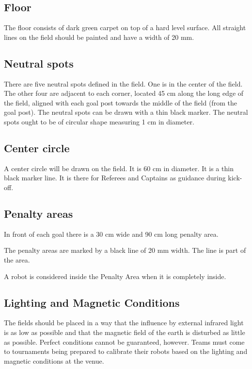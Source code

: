 \documentclass{article}
\begin{document}
\subsection{ Floor \label{ref-033}}

The floor consists of dark green carpet on top of a hard level surface.  All
straight lines on the field should be painted and have a width of 20 mm.

\subsection{ Neutral spots \label{ref-034}}

There are five neutral spots defined in the field. One is in the center of the
field. The other four are adjacent to each corner, located 45 cm along the long
edge of the field, aligned with each goal post towards the middle of the field
(from the goal post). The neutral spots can be drawn with a thin black marker.
The neutral spots ought to be of circular shape measuring 1 cm in diameter.

\subsection{ Center circle \label{ref-035}}

A center circle will be drawn on the field. It is 60 cm in diameter. It is a
thin black marker line. It is there for Referees and Captains as guidance
during kick-off.

\subsection{ Penalty areas \label{ref-036}}

In front of each goal there is a 30 cm wide and 90 cm long penalty area.

The penalty areas are marked by a black line of 20 mm width. The line is part
of the area.

A robot is considered inside the Penalty Area when it is completely inside.

\subsection{Lighting and Magnetic Conditions \label{ref-lighting-conditions}}

The fields should be placed in a way that the influence by external infrared
light is as low as possible and that the magnetic field of the earth is
disturbed as little as possible. Perfect conditions cannot be guaranteed,
however. Teams must come to tournaments being prepared to calibrate their
robots based on the lighting and magnetic conditions at the venue.
\end{document}
